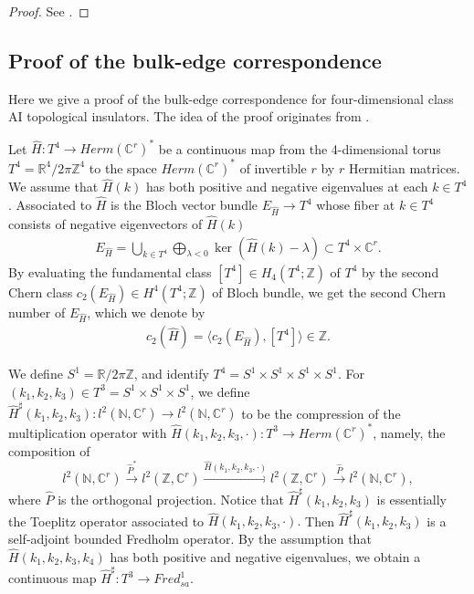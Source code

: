 \documentclass{amsart}
\theoremstyle{definition}
\theoremstyle{remark}
\begin{document}
\begin{proof}
See \cite{Nagata}.
\end{proof}







\subsection{Proof of the bulk-edge correspondence}
\label{subsec:Proof of the bulk-edge correspondence}

Here we give a proof of the bulk-edge correspondence for four-dimensional class AI topological insulators. The idea of the proof originates from \cite{G1}.

Let $\hat{H} \colon T^4\to Herm(\mathbb{C}^r)^{*}$ be a continuous map  from the 4-dimensional torus $T^4=\mathbb{R}^4/2\pi \mathbb{Z}^4$
to the space $Herm(\mathbb{C}^r)^{*}$ of invertible $r$ by $r$ Hermitian matrices. We assume that $\hat{H}(k)$ has  both positive and negative eigenvalues
at each $k\in T^4$. Associated to $\hat{H}$ is the Bloch vector bundle $E_{\hat{H}}\to T^4$ whose fiber at $k\in T^4$ consists of negative eigenvectors of 
$\hat{H}(k)$
\begin{align*}
E_{\hat{H}}=\bigcup_{k \in T^4}\bigoplus_{\lambda <0}\ker(\hat{H}(k)-\lambda)\subset T^4\times \mathbb{C}^r.
\end{align*}
 By evaluating the fundamental class $[T^4]\in H_{4}(T^4;\mathbb{Z})$ of $T^4$ by the second Chern class $c_2(E_{\hat{H}}) \in H^4(T^4;\mathbb{Z})$ of 
 Bloch bundle, we get the second Chern number of $E_{\hat{H}}$, which we denote by
 \begin{align*}
 c_2(\hat{H})=\langle c_2(E_{\hat{H}}), [T^4]\rangle \in \mathbb{Z}.
 \end{align*}

We define \( S^1 = \mathbb{R} / 2\pi \mathbb{Z} \), and identify \( T^4 = S^1 \times S^1 \times S^1 \times S^1 \).
For $(k_1, k_2, k_3) \in T^3=S^1\times S^1 \times S^1$,  
we define $\hat{H}^\sharp(k_1, k_2, k_3) : l^2(\mathbb{N}, \mathbb{C}^r) \to l^2(\mathbb{N}, \mathbb{C}^r)$ to be the compression of the multiplication operator with 
 $\hat{H}(k_1, k_2, k_3, \cdot) : T^3 \to Herm(\mathbb{C}^r)^{*}$, namely, the composition of
 $$
l^2(\mathbb{N}, \mathbb{C}^r) \overset{\hat{P}^*}{\longrightarrow}
l^2(\mathbb{Z}, \mathbb{C}^r) \overset{\hat{H}(k_1, k_2, k_3, \cdot)}{\longrightarrow}
l^2(\mathbb{Z}, \mathbb{C}^r) \overset{\hat{P}}{\longrightarrow}
l^2(\mathbb{N}, \mathbb{C}^r),
$$
where $\hat{P}$ is the orthogonal projection. Notice that $\hat{H}^\sharp(k_1, k_2, k_3)$ is essentially the Toeplitz operator \cite{Douglas} associated to $\hat{H}(k_1,k_2,k_3, \cdot).$ Then $\hat{H}^\sharp(k_1, k_2, k_3)$ is a self-adjoint bounded Fredholm operator. By the assumption that $\hat{H}(k_1, k_2, k_3, k_4)$ has both positive and negative eigenvalues, we obtain a continuous map $\hat{H}^\sharp : T^3 \to Fred_{sa}^1$.
\end{document}
